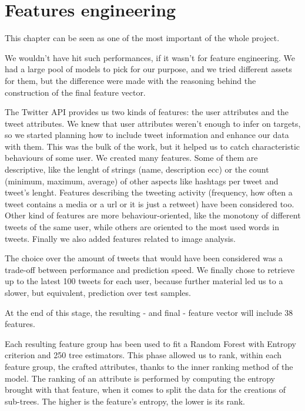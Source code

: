 \chapter{Features engineering}
\label{capitolo4}
\thispagestyle{empty}

This chapter can be seen as one of the most important of the whole project.

We wouldn't have hit such performances, if it wasn't for feature engineering. We had a large pool of models to pick for our purpose,  and we tried different assets for them, but the difference were made with the reasoning behind the construction of the final feature vector.

The Twitter API provides us two kinds of features: the user attributes and the tweet attributes.
We knew that user attributes weren't enough to infer on targets, so we started planning how to include tweet information and enhance our data with them. This was the bulk of the work, but it helped us to catch characteristic behaviours of some user.
We created many features. Some of them are descriptive, like the lenght of strings (name, description ecc) or the count (minimum, maximum, average) of other aspects like hashtags per tweet and tweet's lenght. Features describing the tweeting activity (frequency, how often a tweet contains a media or a url or it is just a retweet) have been considered too.
Other kind of features are more behaviour-oriented, like the monotony of different tweets of the same user, while others are oriented to the most used words in tweets.
Finally we also added features related to image analysis.

The choice over the amount of tweets that would have been considered was a trade-off between performance and prediction speed.
We finally chose to retrieve up to the latest 100 tweets for each user, because further material led us to a slower, but equivalent, prediction over test samples.

At the end of this stage, the resulting - and final - feature vector will include 38 features.

Each resulting feature group has been used to fit a Random Forest with Entropy criterion and 250 tree estimators. This phase allowed us to rank, within each feature group, the crafted attributes, thanks to the inner ranking method of the model.
The ranking of an attribute is performed by computing the entropy brought with that feature, when it comes to split the data for the creations of sub-trees. The higher is the feature's entropy, the lower is its rank.

